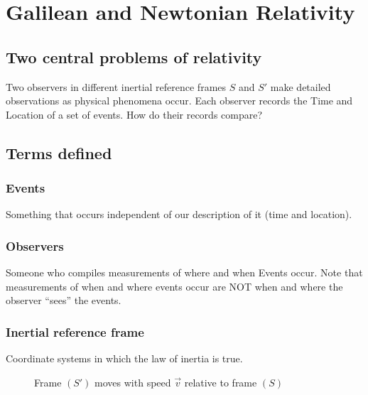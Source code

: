 \documentclass[a4paper,11pt]{article}
\numberwithin{equation}{section}
\begin{document}
 \tableofcontents
 \newpage
 
 \section{Galilean and Newtonian Relativity}
 \subsection{Two central problems of relativity}
 Two observers in different inertial reference frames $S$ and $S'$ make detailed observations as physical phenomena occur. Each observer records the Time and Location of a set of events. How do their records compare?
 \subsection{Terms defined}
 \subsubsection{Events}
 Something that occurs independent of our description of it (time and location).
 \subsubsection{Observers}
 Someone who compiles measurements of where and when Events occur. Note that measurements of when and where events occur are NOT when and where the observer ``sees'' the events.
 \subsubsection{Inertial reference frame}
 Coordinate systems in which the law of inertia is true.
  \begin{figure}[h!] %
  \centering
    \caption{Frame $(S')$ moves with speed $\vec{v}$ relative to frame $(S)$}
    \label{fig: s to s'}
  \end{figure}
  
\end{document}
